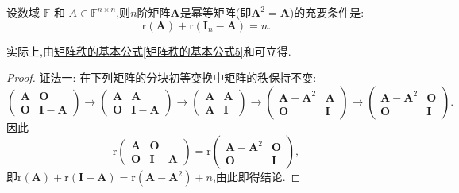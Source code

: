 \documentclass[../../main.tex]{subfiles}
\begin{document}
\begin{proposition}[幂等矩阵关于秩的判定准则]\label{proposition:幂等矩阵关于秩的判定准则}
设数域 $\mathbb{F}$ 和 $A \in \mathbb{F}^{n \times n}$,则\(n\)阶矩阵\(\boldsymbol{A}\)是幂等矩阵(即\(\boldsymbol{A}^2 = \boldsymbol{A}\))的充要条件是:
\[
\mathrm{r}(\boldsymbol{A})+\mathrm{r}(\boldsymbol{I}_n - \boldsymbol{A}) = n.
\]
\end{proposition}
\begin{note}
实际上,由\hyperref[矩阵秩的基本公式5]{矩阵秩的基本公式\ref{矩阵秩的基本公式5}}和可立得.
\end{note}
\begin{proof}
{\color{blue}证法一:}
在下列矩阵的分块初等变换中矩阵的秩保持不变:
\[
\begin{pmatrix}
\boldsymbol{A}&\boldsymbol{O}\\
\boldsymbol{O}&\boldsymbol{I}-\boldsymbol{A}
\end{pmatrix}\to
\begin{pmatrix}
\boldsymbol{A}&\boldsymbol{A}\\
\boldsymbol{O}&\boldsymbol{I}-\boldsymbol{A}
\end{pmatrix}\to
\begin{pmatrix}
\boldsymbol{A}&\boldsymbol{A}\\
\boldsymbol{A}&\boldsymbol{I}
\end{pmatrix}\to
\begin{pmatrix}
\boldsymbol{A}-\boldsymbol{A}^2&\boldsymbol{A}\\
\boldsymbol{O}&\boldsymbol{I}
\end{pmatrix}\to
\begin{pmatrix}
\boldsymbol{A}-\boldsymbol{A}^2&\boldsymbol{O}\\
\boldsymbol{O}&\boldsymbol{I}
\end{pmatrix}.
\]
因此
\[
\mathrm{r}\begin{pmatrix}
\boldsymbol{A}&\boldsymbol{O}\\
\boldsymbol{O}&\boldsymbol{I}-\boldsymbol{A}
\end{pmatrix}=\mathrm{r}\begin{pmatrix}
\boldsymbol{A}-\boldsymbol{A}^2&\boldsymbol{O}\\
\boldsymbol{O}&\boldsymbol{I}
\end{pmatrix},
\]
即\(\mathrm{r}(\boldsymbol{A})+\mathrm{r}(\boldsymbol{I}-\boldsymbol{A})=\mathrm{r}(\boldsymbol{A}-\boldsymbol{A}^2)+n\),由此即得结论.


\end{proof}
\end{document}
